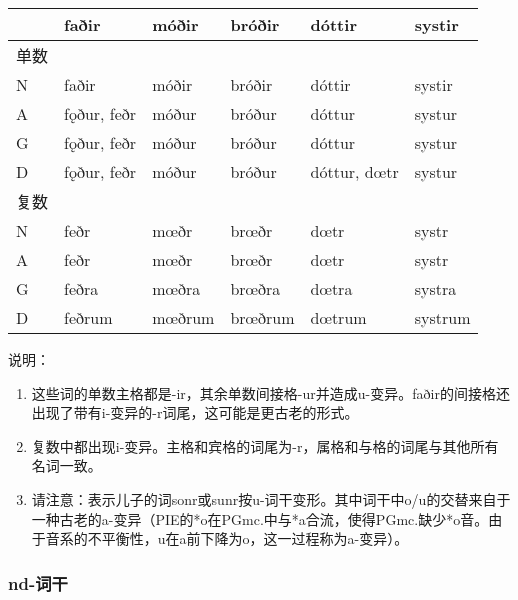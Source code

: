 \begin{longtable}{llllll}
  \toprule
     & \textbf{faðir} & \textbf{móðir} & \textbf{bróðir} & \textbf{dóttir} & \textbf{systir} \\
  \midrule
  \endhead
  \bottomrule
  \endfoot
  单数 &                &                &                 &                 &                 \\
  N  & faðir          & móðir          & bróðir          & dóttir          & systir          \\
  A  & fǫður, feðr    & móður          & bróður          & dóttur          & systur          \\
  G  & fǫður, feðr    & móður          & bróður          & dóttur          & systur          \\
  D  & fǫður, feðr    & móður          & bróður          & dóttur, dœtr    & systur          \\
  复数 &                &                &                 &                 &                 \\
  N  & feðr           & mœðr           & brœðr           & dœtr            & systr           \\
  A  & feðr           & mœðr           & brœðr           & dœtr            & systr           \\
  G  & feðra          & mœðra          & brœðra          & dœtra           & systra          \\
  D  & feðrum         & mœðrum         & brœðrum         & dœtrum          & systrum         \\
\end{longtable}

说明：

\begin{enumerate}
  \item
        这些词的单数主格都是-ir，其余单数间接格-ur并造成u-变异。faðir的间接格还出现了带有i-变异的-r词尾，这可能是更古老的形式。
  \item
        复数中都出现i-变异。主格和宾格的词尾为-r，属格和与格的词尾与其他所有名词一致。
  \item
        请注意：表示儿子的词sonr或sunr按u-词干变形。其中词干中o/u的交替来自于一种古老的a-变异（PIE的*o在PGmc.中与*a合流，使得PGmc.缺少*o音。由于音系的不平衡性，u在a前下降为o，这一过程称为a-变异）。
\end{enumerate}

\subsubsection{nd-词干}

